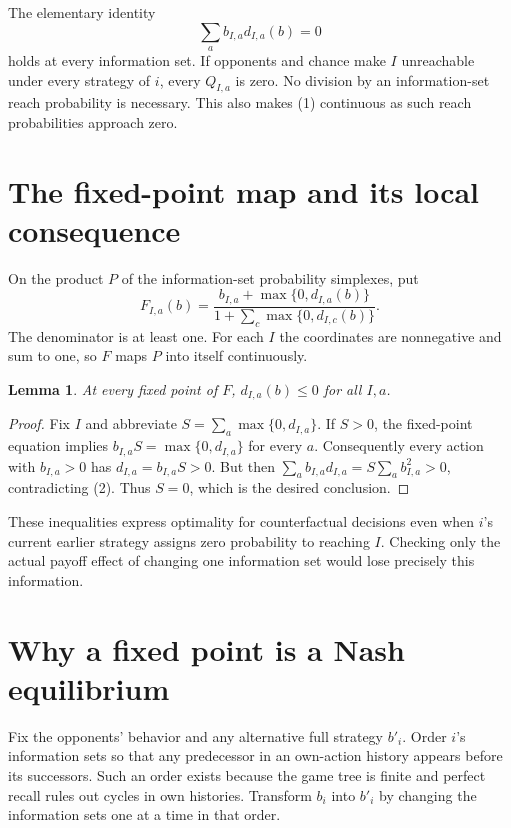 \documentclass[11pt]{article}
\newtheorem{lemma}{Lemma}
\begin{document}
The elementary identity
\[
                         \sum_a b_{I,a}d_{I,a}(b)=0               \tag{2}
\]
holds at every information set. If opponents and chance make $I$
unreachable under every strategy of $i$, every $Q_{I,a}$ is zero.
No division by an information-set reach probability is necessary. This
also makes (1) continuous as such reach probabilities approach zero.

\section*{The fixed-point map and its local consequence}
On the product $P$ of the information-set probability simplexes, put
\[
 F_{I,a}(b)=
 \frac{b_{I,a}+\max\{0,d_{I,a}(b)\}}
      {1+\sum_c\max\{0,d_{I,c}(b)\}}.                            \tag{3}
\]
The denominator is at least one. For each $I$ the coordinates are
nonnegative and sum to one, so $F$ maps $P$ into itself continuously.

\begin{lemma}
At every fixed point of $F$, $d_{I,a}(b)\leq0$ for all $I,a$.
\end{lemma}
\begin{proof}
Fix $I$ and abbreviate $S=\sum_a\max\{0,d_{I,a}\}$. If $S>0$, the
fixed-point equation implies $b_{I,a}S=\max\{0,d_{I,a}\}$ for every $a$.
Consequently every action with $b_{I,a}>0$ has
$d_{I,a}=b_{I,a}S>0$. But then
$\sum_a b_{I,a}d_{I,a}=S\sum_a b_{I,a}^2>0$, contradicting (2).
Thus $S=0$, which is the desired conclusion.
\end{proof}

These inequalities express optimality for counterfactual decisions even
when $i$'s current earlier strategy assigns zero probability to reaching
$I$. Checking only the actual payoff effect of changing one information
set would lose precisely this information.

\section*{Why a fixed point is a Nash equilibrium}
Fix the opponents' behavior and any alternative full strategy $b'_i$.
Order $i$'s information sets so that any predecessor in an own-action
history appears before its successors. Such an order exists because the
game tree is finite and perfect recall rules out cycles in own histories.
Transform $b_i$ into $b'_i$ by changing the information sets one at a time
in that order.
\end{document}

